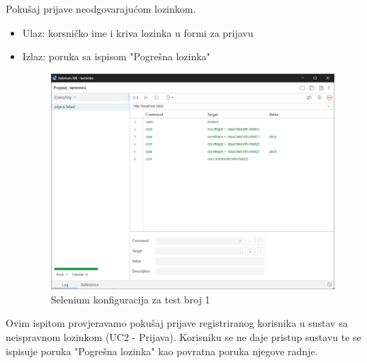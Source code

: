 			 \begin{packed_enum}
			 	\item Pokušaj prijave neodgovarajućom lozinkom.
			 	\begin{itemize}
			 		\item Ulaz: korsničko ime i kriva lozinka u formi za prijavu
			 		\item Izlaz: poruka sa ispisom "Pogrešna lozinka"
			 	\begin{figure}[H]
			 		\includegraphics[width=0.95\linewidth]{slike/test0.png}
			 		\centering
			 		\caption{Selenium konfiguracija za test broj 1}
			 		\label{fig:dijagram_razmjestaja}
			 	\end{figure}
		 		\end{itemize}
	 			Ovim ispitom provjeravamo pokušaj prijave registriranog korisnika u sustav sa neispravnom lozinkom (UC2 - Prijava). Korisniku se ne daje pristup sustavu te se ispisuje poruka "Pogrešna lozinka" kao povratna poruka njegove radnje.
	 			\eject
	 		

\end{packed_enum}

